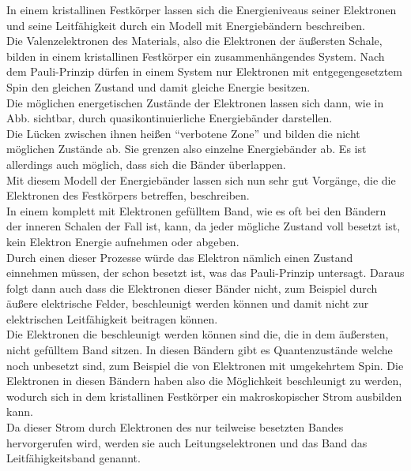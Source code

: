 In einem kristallinen Festkörper lassen sich die Energieniveaus seiner Elektronen und seine Leitfähigkeit durch
ein Modell mit Energiebändern beschreiben.\\
Die Valenzelektronen des Materials, also die Elektronen der äußersten Schale, 
bilden in einem kristallinen Festkörper ein zusammenhängendes System. Nach dem Pauli-Prinzip dürfen in einem System nur Elektronen mit entgegengesetztem Spin
den gleichen Zustand und damit gleiche Energie besitzen.\\
Die möglichen energetischen Zustände der Elektronen lassen sich dann, wie in Abb. sichtbar,
durch quasikontinuierliche Energiebänder darstellen.\\
Die Lücken zwischen ihnen heißen \enquote{verbotene Zone} und bilden die nicht möglichen Zustände ab. Sie grenzen also einzelne Energiebänder ab.
Es ist allerdings auch möglich, dass sich die Bänder überlappen.\\
Mit diesem Modell der Energiebänder lassen sich nun sehr gut Vorgänge, die die Elektronen des Festkörpers betreffen, beschreiben.\\
In einem komplett mit Elektronen gefülltem Band, wie es oft bei den Bändern der inneren 
Schalen der Fall ist, kann, da jeder mögliche Zustand voll besetzt ist,
kein Elektron Energie aufnehmen oder abgeben. \\
Durch einen dieser Prozesse würde das Elektron nämlich einen Zustand einnehmen müssen, der schon besetzt ist, was das Pauli-Prinzip untersagt.
Daraus folgt dann auch dass die Elektronen dieser Bänder nicht, zum Beispiel durch äußere elektrische Felder, beschleunigt werden können 
und damit nicht zur elektrischen Leitfähigkeit beitragen können.\\
Die Elektronen die beschleunigt werden können sind die, die in dem äußersten, nicht gefülltem Band sitzen.
In diesen Bändern gibt es Quantenzustände welche noch unbesetzt sind, zum Beispiel die von Elektronen mit umgekehrtem Spin.
Die Elektronen in diesen Bändern haben also die Möglichkeit beschleunigt zu werden, wodurch sich in dem kristallinen Festkörper
ein makroskopischer Strom ausbilden kann.\\
Da dieser Strom durch Elektronen des nur teilweise besetzten Bandes hervorgerufen wird, werden sie auch Leitungselektronen und das Band das Leitfähigkeitsband genannt.\\\\



